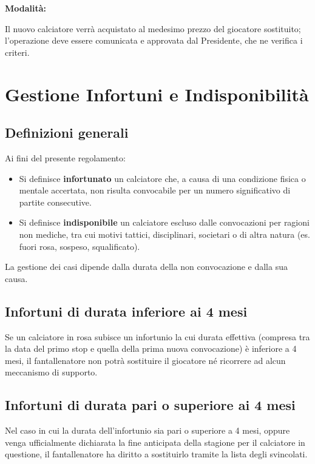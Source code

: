 \noindent \textbf{Modalità:}

Il nuovo calciatore verrà acquistato al medesimo prezzo del giocatore sostituito; l'operazione deve essere comunicata e approvata dal Presidente, che ne verifica i criteri.



\chapter{Gestione Infortuni e Indisponibilità}
\label{cap:gestione-infortuni}

\section{Definizioni generali}
\label{art:7.1}

\noindent
Ai fini del presente regolamento:

\begin{itemize}
\item Si definisce \textbf{infortunato} un calciatore che, a causa di una condizione fisica o mentale accertata, non risulta convocabile per un numero significativo di partite consecutive.
\item Si definisce \textbf{indisponibile} un calciatore escluso dalle convocazioni per ragioni non mediche, tra cui motivi tattici, disciplinari, societari o di altra natura (es. fuori rosa, sospeso, squalificato).
\end{itemize}

\noindent
La gestione dei casi dipende dalla durata della non convocazione e dalla sua causa.

\section{Infortuni di durata inferiore ai 4 mesi}
\label{art:7.2}

Se un calciatore in rosa subisce un infortunio la cui durata effettiva (compresa tra la data del primo stop e quella della prima nuova convocazione) è inferiore a 4 mesi, il fantallenatore non potrà sostituire il giocatore né ricorrere ad alcun meccanismo di supporto.

\section{Infortuni di durata pari o superiore ai 4 mesi}
\label{art:7.3}

Nel caso in cui la durata dell'infortunio sia pari o superiore a 4 mesi, oppure venga ufficialmente dichiarata la fine anticipata della stagione per il calciatore in questione, il fantallenatore ha diritto a sostituirlo tramite la lista degli svincolati.

